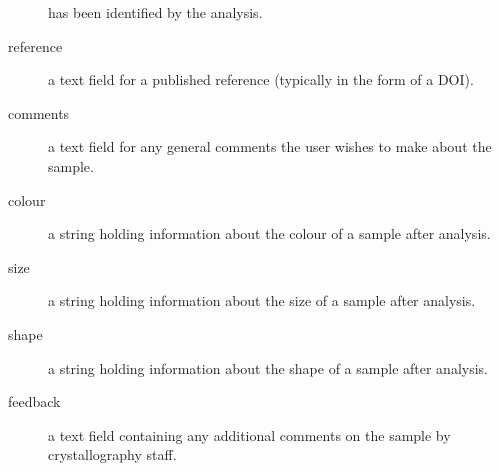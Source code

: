 \documentclass[12pt,twoside]{article}
\begin{document}
\begin{description}
has been identified by the analysis.
\item[reference]
a text field for a published reference (typically in the form of a DOI).
\item[comments]
a text field for any general comments the user wishes to make about the sample.
\item[colour]
a string holding information about the colour of a sample after analysis.
\item[size]
a string holding information about the size of a sample after analysis.
\item[shape]
a string holding information about the shape of a sample after analysis.
\item[feedback]
a text field containing any additional comments on the sample by
crystallography staff.
\end{description}
\end{document}
